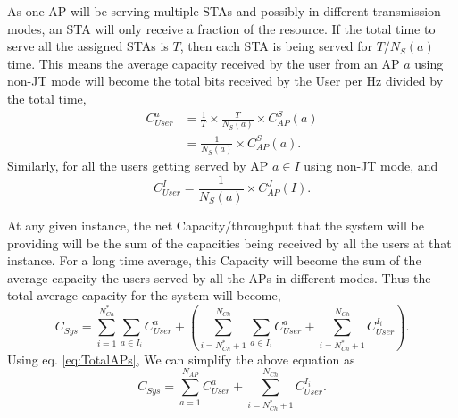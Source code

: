 As one AP will be serving multiple STAs and possibly in different transmission modes, an STA will only receive a fraction of the resource.
If the total time to serve all the assigned STAs is $T$, then each STA is being served for $T / N_S(a)$ time.
This means the average capacity received by the user from an AP $a$ using non-JT mode will become the total bits received by the User per Hz divided by the total time,
\begin{align} %
    \label{eq:avgCapacityForUserNJT}
    C_{User}^a &= \frac{1}{T} \times \frac{T}{N_S(a)} \times C_{AP}^S(a) \nonumber
    \\
    &= \frac{1}{N_S(a)} \times C_{AP}^S(a).
\end{align}
Similarly, for all the users getting served by AP $a \in I$ using non-JT mode, and
\begin{equation} %
    \label{eq:avgCapacityForUserJT}
    C_{User}^I = \frac{1}{N_S(a)} \times C_{AP}^J(I).
\end{equation}

At any given instance, the net Capacity/throughput that the system will be providing will be the sum of the capacities being received by all the users at that instance.
For a long time average, this Capacity will become the sum of the average capacity the users served by all the APs in different modes.
Thus the total average capacity for the system will become,
\begin{equation}
    C_{Sys} = \sum_{i = 1}^{N_{Ch}^*} \sum_{a \in I_i} C_{User}^a +
    \left( 
    \sum_{i = N_{Ch}^* + 1}^{N_{Ch}} \sum_{a \in I_i} C_{User}^a  + 
    \sum_{i = N_{Ch}^* + 1}^{N_{Ch}} C_{User}^{I_i} 
    \right).
\end{equation}
Using eq. \ref{eq:TotalAPs}, We can simplify the above equation as
\begin{equation}
    C_{Sys} = \sum_{a=1}^{N_{AP}} C_{User}^a + 
    \sum_{i = N_{Ch}^* + 1}^{N_{Ch}} C_{User}^{I_i}.
\end{equation}








